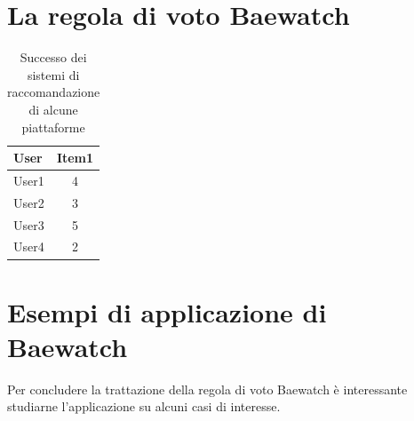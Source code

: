 \documentclass[letterpaper]{article}
\begin{document}
\section{La regola di voto Baewatch}


\begin{table}[]
\centering
\begin{tabular}{|c|c|}
\hline
\multicolumn{1}{|l|}{\textbf{User}} & \multicolumn{1}{l|}{\textbf{Item1}} \\ \hline
User1                               & 4                                   \\ \hline
User2                               & 3                                   \\ \hline
User3                               & 5                                   \\ \hline
User4                               & 2                                   \\ \hline
\end{tabular}
\caption{Successo dei sistemi di raccomandazione di alcune piattaforme \cite{ref1}}
\label{table:1}
\end{table}
        

\section{Esempi di applicazione di Baewatch}
Per concludere la trattazione della regola di voto Baewatch è interessante studiarne l'applicazione su alcuni casi di interesse.
\end{document}
